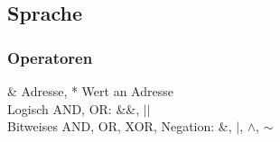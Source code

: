 \subsection{Sprache}

\subsubsection{Operatoren}
\& Adresse, * Wert an Adresse\\
Logisch AND, OR: \&\&, $\vert\vert$ \\
Bitweises AND, OR, XOR, Negation: \&, $\vert$, $\wedge$, $\sim$




